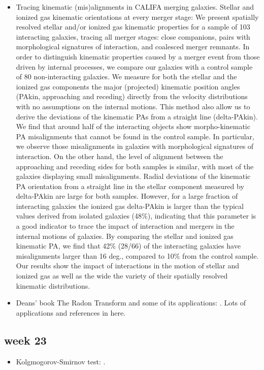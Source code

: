 \documentclass[ceqn,usenatbib,onecolumn]{mnras}
\begin{document}
\begin{itemize}
    \item \citet{2015A&A...582A..21B} Tracing kinematic (mis)alignments in CALIFA merging galaxies. Stellar and ionized gas kinematic orientations at every merger stage: We present spatially resolved stellar and/or ionized gas kinematic properties for a sample of 103 interacting galaxies, tracing all merger stages: close companions, pairs with morphological signatures of interaction, and coalesced merger remnants. In order to distinguish kinematic properties caused by a merger event from those driven by internal processes, we compare our galaxies with a control sample of 80 non-interacting galaxies. We measure for both the stellar and the ionized gas components the major (projected) kinematic position angles (PAkin, approaching and receding) directly from the velocity distributions with no assumptions on the internal motions. This method also allow us to derive the deviations of the kinematic PAs from a straight line (delta-PAkin). We find that around half of the interacting objects show morpho-kinematic PA misalignments that cannot be found in the control sample. In particular, we observe those misalignments in galaxies with morphological signatures of interaction. On the other hand, the level of alignment between the approaching and receding sides for both samples is similar, with most of the galaxies displaying small misalignments. Radial deviations of the kinematic PA orientation from a straight line in the stellar component measured by delta-PAkin are large for both samples. However, for a large fraction of interacting galaxies the ionized gas delta-PAkin is larger than the typical values derived from isolated galaxies (48\%), indicating that this parameter is a good indicator to trace the impact of interaction and mergers in the internal motions of galaxies. By comparing the stellar and ionized gas kinematic PA, we find that 42\% (28/66) of the interacting galaxies have misalignments larger than 16 deg., compared to 10\% from the control sample. Our results show the impact of interactions in the motion of stellar and ionized gas as well as the wide the variety of their spatially resolved kinematic distributions.
    \item Deans' book The Radon Transform and some of its applications: \citet{deans2007radon}. Lots of applications and references in here.
\end{itemize}
\subsection{week 23}
\begin{itemize}
    \item Kolgmogorov-Smirnov test: \citet{hodges1958significance}.
\end{itemize}
\end{document}
